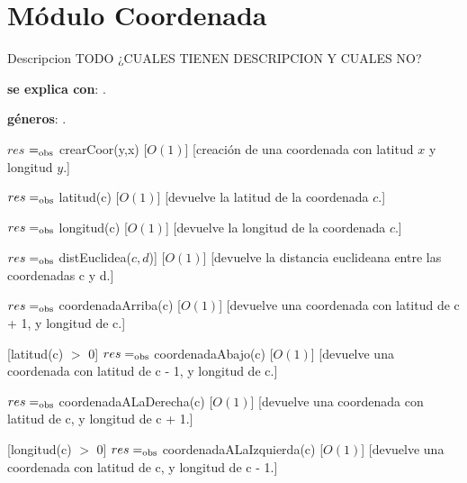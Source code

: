 \section{Módulo Coordenada}

Descripcion TODO ¿CUALES TIENEN DESCRIPCION Y CUALES NO?

\begin{Interfaz}

	\textbf{se explica con}: .

	\textbf{géneros}: .


	{$res$ $=_{\mathrm{obs}}$ crearCoor(y,x)}
	[$O(1)$]
	[creación de una coordenada con latitud $x$ y longitud $y$.]

	{$res =_{\mathrm{obs}}$ latitud(c)}
	[$O(1)$]
	[devuelve la latitud de la coordenada $c$.]

	{$res =_{\mathrm{obs}}$ longitud(c)}
	[$O(1)$]
	[devuelve la longitud de la coordenada $c$.]

	{$res =_{\mathrm{obs}}$ distEuclidea($c, d$)]}
	[$O(1)$]
	[devuelve la distancia euclideana entre las coordenadas c y d.]

	{$res =_{\mathrm{obs}}$ coordenadaArriba(c)}
	[$O(1)$]
	[devuelve una coordenada con latitud de c + 1, y longitud de c.]

	[latitud(c) $>$ 0]
	{$res =_{\mathrm{obs}}$ coordenadaAbajo(c)}
	[$O(1)$]
	[devuelve una coordenada con latitud de c - 1, y longitud de c.]

	{$res =_{\mathrm{obs}}$ coordenadaALaDerecha(c)}
	[$O(1)$]
	[devuelve una coordenada con latitud de c, y longitud de c + 1.]

	[longitud(c) $>$ 0]
	{$res =_{\mathrm{obs}}$ coordenadaALaIzquierda(c)}
	[$O(1)$]
	[devuelve una coordenada con latitud de c, y longitud de c - 1.]

\end{Interfaz}


